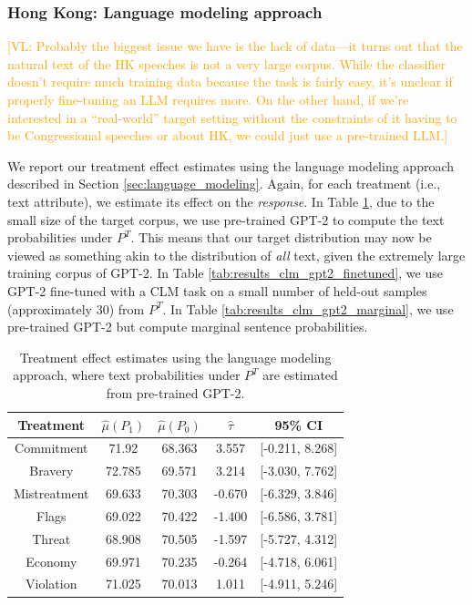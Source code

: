 \documentclass{article}
\newcommand{\vl}[1]{\textcolor{orange}{[VL: #1]}}
\begin{document}
\subsubsection{Hong Kong: Language modeling approach}

\vl{Probably the biggest issue we have is the lack of data---it turns out that the natural text of the HK speeches is not a very large corpus. While the classifier doesn't require much training data because the task is fairly easy, it's unclear if properly fine-tuning an LLM requires more.
\newline
\newline
On the other hand, if we're interested in a ``real-world'' target setting without the constraints of it having to be Congressional speeches or about HK, we could just use a pre-trained LLM.}

We report our treatment effect estimates using the language modeling approach described in Section \ref{sec:language_modeling}. Again, for each treatment (i.e., text attribute), we estimate its effect on the \textit{response}. In Table \ref{tab:results_clm_gpt2}, due to the small size of the target corpus, we use pre-trained GPT-2 \cite{radford2019language} to compute the text probabilities under $P^T$. This means that our target distribution may now be viewed as something akin to the distribution of \textit{all} text, given the extremely large training corpus of GPT-2. In Table \ref{tab:results_clm_gpt2_finetuned}, we use GPT-2 fine-tuned with a CLM task on a small number of held-out samples (approximately 30) from $P^T$. In Table \ref{tab:results_clm_gpt2_marginal}, we use pre-trained GPT-2 but compute marginal sentence probabilities.

\begin{table}[!ht]
    \centering
    \begin{tabular}{c|cccc}
        \toprule
        Treatment & $\hat{\mu}(P_1)$ & $\hat{\mu}(P_0)$ & $\hat{\tau}$ & 95\% CI \\
        \midrule
        Commitment & 71.92 & 68.363 & \textcolor{green!50!black}{3.557} & [-0.211, 8.268] \\
        Bravery & 72.785 & 69.571 & \textcolor{green!50!black}{3.214} & [-3.030, 7.762]  \\
        Mistreatment & 69.633 & 70.303 & \textcolor{red!80!black}{-0.670} & [-6.329, 3.846]  \\
        Flags & 69.022 & 70.422 & \textcolor{red!80!black}{-1.400} & [-6.586, 3.781] \\
        Threat & 68.908 & 70.505 & \textcolor{red!80!black}{-1.597} & [-5.727, 4.312] \\
        Economy & 69.971 & 70.235 & \textcolor{red!80!black}{-0.264} & [-4.718, 6.061] \\
        Violation & 71.025 & 70.013 & \textcolor{green!50!black}{1.011} & [-4.911, 5.246] \\
        \bottomrule
    \end{tabular}
    \caption{Treatment effect estimates using the language modeling approach, where text probabilities under $P^T$ are estimated from pre-trained GPT-2.}
    \label{tab:results_clm_gpt2}
\end{table}
\end{document}

